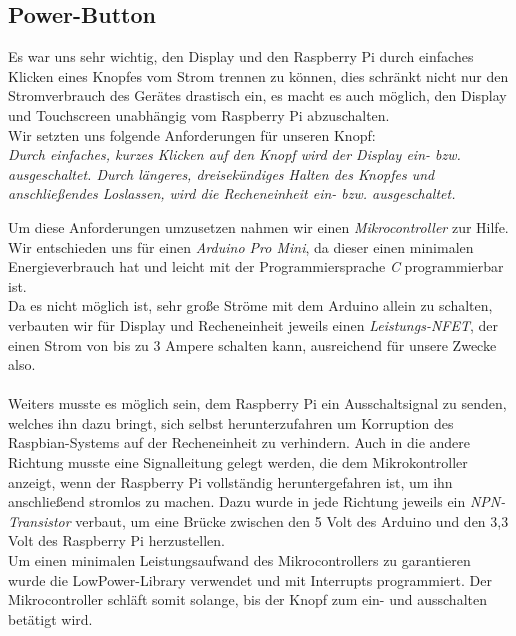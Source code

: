 \subsection{Power-Button}

Es war uns sehr wichtig, den Display und den Raspberry Pi durch einfaches Klicken eines Knopfes vom Strom trennen zu können, dies schränkt nicht nur den Stromverbrauch des Gerätes drastisch ein, es macht es auch möglich, den Display und Touchscreen unabhängig vom Raspberry Pi abzuschalten.\\

Wir setzten uns folgende Anforderungen für unseren Knopf:\\
\textit{Durch einfaches, kurzes Klicken auf den Knopf wird der Display ein- bzw. ausgeschaltet.
Durch längeres, dreisekündiges Halten des Knopfes und anschließendes Loslassen, wird die Recheneinheit ein- bzw. ausgeschaltet.}

Um diese Anforderungen umzusetzen nahmen wir einen \textit{Mikrocontroller} zur Hilfe. Wir entschieden uns für einen \textit{Arduino Pro Mini}, da dieser einen minimalen Energieverbrauch hat und leicht mit der Programmiersprache \textit{C} programmierbar ist.\\

Da es nicht möglich ist, sehr große Ströme mit dem Arduino allein zu schalten, verbauten wir für Display und Recheneinheit jeweils einen \textit{Leistungs-NFET}, der einen Strom von bis zu 3 Ampere schalten kann, ausreichend für unsere Zwecke also.\\\\

Weiters musste es möglich sein, dem Raspberry Pi ein Ausschaltsignal zu senden, welches ihn dazu bringt, sich selbst herunterzufahren um Korruption des Raspbian-Systems auf der Recheneinheit zu verhindern. Auch in die andere Richtung musste eine Signalleitung gelegt werden, die dem Mikrokontroller anzeigt, wenn der Raspberry Pi vollständig heruntergefahren ist, um ihn anschließend stromlos zu machen. Dazu wurde in jede Richtung jeweils ein \textit{NPN-Transistor} verbaut, um eine Brücke zwischen den 5 Volt des Arduino und den 3,3 Volt des Raspberry Pi herzustellen.\\

Um einen minimalen Leistungsaufwand des Mikrocontrollers zu garantieren wurde die LowPower-Library verwendet und mit Interrupts programmiert. Der Mikrocontroller schläft somit solange, bis der Knopf zum ein- und ausschalten betätigt wird.

